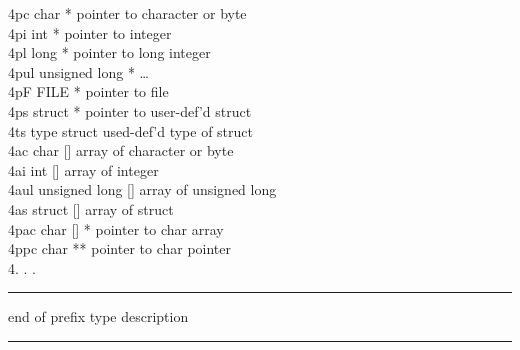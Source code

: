 \begin{mylist}
4pc       char *          pointer to character or byte\\
4pi       int *                   pointer to integer\\
4pl       long *          pointer to long integer\\
4pul      unsigned long *         \dots\\
4pF       FILE *          pointer to file\\
4ps       struct *                pointer to user-def'd struct\\
4ts       type struct             used-def'd type of struct\\
4ac       char []                 array of character or byte\\
4ai       int []          array of integer\\
4aul      unsigned long []        array of unsigned long\\
4as       struct []               array of struct\\
4pac      char [] *               pointer to char array\\
4ppc      char **                 pointer to char pointer\\
4.          .                     . \\ \hrule
end of prefix  type  description \\     \hrule
\end{mylist}










